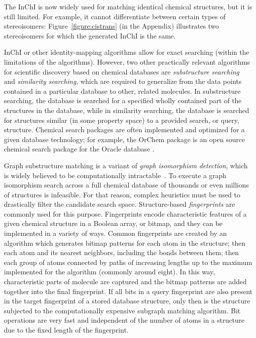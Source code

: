 \documentclass{sig-alternate}
\begin{document}

The InChI is now widely used for matching identical chemical
structures, but it is still limited. For example, it cannot
differentiate between certain types of stereoisomers:
Figure~\ref{figure:cistrans} (in the Appendix) illustrates two
stereoisomers for which the generated InChI is the same.

InChI or other identity-mapping algorithms allow for exact searching
(within the limitations of the algorithms). However, two other
practically relevant algorithms for scientific discovery based on
chemical databases are \emph{substructure searching} and
\emph{similarity searching}, which are required to generalize from the
data points contained in a particular database to other, related
molecules. In substructure searching, the database is searched for a
specified wholly contained part of the structures in the database,
while in similarity searching, the database is searched for structures
similar (in some property space) to a provided search, or query,
structure. Chemical search packages are often implemented and
optimized for a given database technology; for example, the OrChem
package is an open source chemical search package for the Oracle
database \cite{rijnbeek2009}.

Graph substructure matching is a variant of \emph{graph isomorphism
  detection}, which is widely believed to be computationally
intractable~\cite{cordella2001}. To execute a graph isomorphism search
across a full chemical database of thousands or even millions of
structures is infeasible. For that reason, complex heuristics must be
used to drastically filter the candidate search space. Structure-based
\emph{fingerprints} are commonly used for this purpose. Fingerprints
encode characteristic features of a given chemical structure in a
Boolean array, or bitmap, and they can be implemented in a variety of
ways. Common fingerprints are created by an algorithm which generates
bitmap patterns for each atom in the structure; then each atom and its
nearest neighbors, including the bonds between them; then each group
of atoms connected by paths of increasing lengths up to the maximum
implemented for the algorithm (commonly around eight). In this way,
characteristic parts of molecule are captured and the bitmap patterns
are added together into the final fingerprint. If all bits in a query
fingerprint are also present in the target fingerprint of a stored
database structure, only then is the structure subjected to the
computationally expensive subgraph matching algorithm. Bit operations
are very fast and independent of the number of atoms in a structure
due to the fixed length of the fingerprint.
\end{document}
